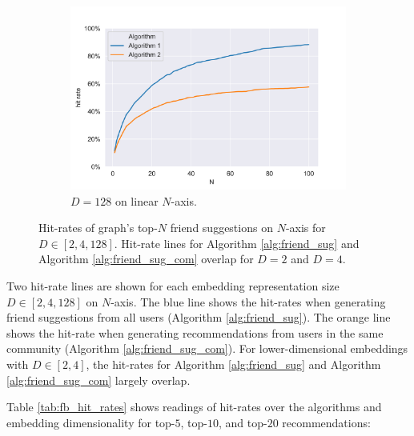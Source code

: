 \documentclass[conference]{IEEEtran}
\begin{document}
\begin{figure}[htbp]
    \begin{subfigure}{.48\textwidth}
        \centering
        \includegraphics[width=1\linewidth]{images/fb/hit_rates_d-128.png}
        \caption{$D=128$ on linear $N$-axis.}
        \label{fig:fb_hit_rates_d128}
    \end{subfigure}%

    \caption{Hit-rates of \citet{social_circles_fb} graph's top-$N$ friend suggestions on $N$-axis for $D \in [2,4,128]$. Hit-rate lines for Algorithm \ref{alg:friend_sug} and Algorithm \ref{alg:friend_sug_com} overlap for $D=2$ and $D=4$.}
    \label{fig:fb_hit_rates}
\end{figure}

Two hit-rate lines are shown for each embedding representation size $D \in [2,4,128]$ on $N$-axis. The blue line shows the hit-rates when generating friend suggestions from all users (Algorithm \ref{alg:friend_sug}). The orange line shows the hit-rate when generating recommendations from users in the same community (Algorithm \ref{alg:friend_sug_com}). For lower-dimensional embeddings with $D \in [2,4]$, the hit-rates for Algorithm \ref{alg:friend_sug} and Algorithm \ref{alg:friend_sug_com} largely overlap.

Table \ref{tab:fb_hit_rates} shows readings of hit-rates over the algorithms and embedding dimensionality for top-$5$, top-$10$, and top-$20$ recommendations:
\end{document}
